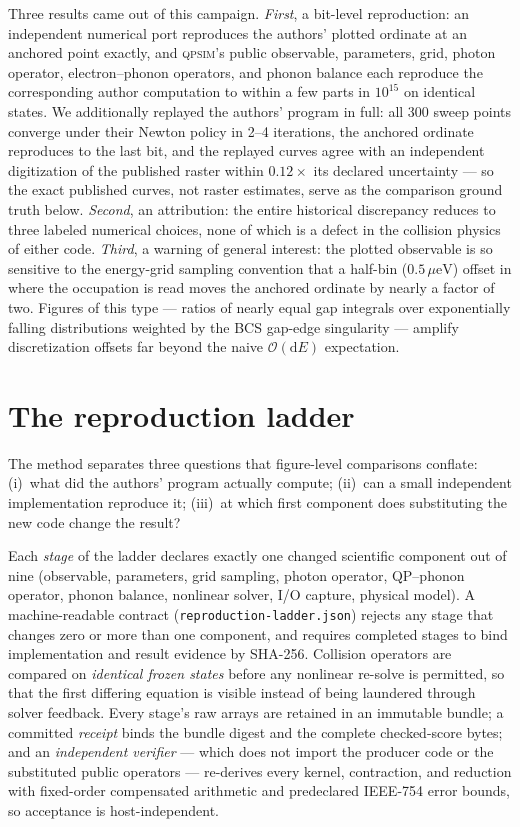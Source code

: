 \documentclass[reprint,amsmath,amssymb,aps,prapplied,nofootinbib]{revtex4-2}
\newcommand{\qpsim}{\textsc{qpsim}}
\newcommand{\ueV}{\,\mu\mathrm{eV}}
\begin{document}
Three results came out of this campaign.
\emph{First}, a bit-level reproduction: an independent numerical port
reproduces the authors' plotted ordinate at an anchored point exactly,
and \qpsim{}'s public observable, parameters, grid, photon operator,
electron--phonon operators, and phonon balance each reproduce the
corresponding author computation to within a few parts in $10^{15}$ on
identical states.  We additionally replayed the authors' program in
full: all 300 sweep points converge under their Newton policy in 2--4
iterations, the anchored ordinate reproduces to the last bit, and the
replayed curves agree with an independent digitization of the
published raster within $0.12\times$ its declared uncertainty ---
so the exact published curves, not raster estimates, serve as the
comparison ground truth below.  \emph{Second}, an attribution: the entire historical
discrepancy reduces to three labeled numerical choices, none of which is
a defect in the collision physics of either code.  \emph{Third}, a
warning of general interest: the plotted observable is so sensitive to
the energy-grid sampling convention that a half-bin ($0.5\ueV$) offset
in where the occupation is read moves the anchored ordinate by nearly a
factor of two.  Figures of this type --- ratios of nearly equal gap
integrals over exponentially falling distributions weighted by the BCS
gap-edge singularity --- amplify discretization offsets far beyond the
naive $\mathcal{O}(\mathrm{d}E)$ expectation.

\section{The reproduction ladder}
\label{sec:ladder}

The method separates three questions that figure-level comparisons
conflate: (i)~what did the authors' program actually compute; (ii)~can a
small independent implementation reproduce it; (iii)~at which first
component does substituting the new code change the result?

Each \emph{stage} of the ladder declares exactly one changed scientific
component out of nine (observable, parameters, grid sampling, photon
operator, QP--phonon operator, phonon balance, nonlinear solver, I/O
capture, physical model).  A machine-readable contract
(\texttt{reproduction-ladder.json}) rejects any stage that changes zero
or more than one component, and requires completed stages to bind
implementation and result evidence by SHA-256.  Collision operators are
compared on \emph{identical frozen states} before any nonlinear re-solve
is permitted, so that the first differing equation is visible instead of
being laundered through solver feedback.  Every stage's raw arrays are
retained in an immutable bundle; a committed \emph{receipt} binds the
bundle digest and the complete checked-score bytes; and an
\emph{independent verifier} --- which does not import the producer code
or the substituted public operators --- re-derives every kernel,
contraction, and reduction with fixed-order compensated arithmetic and
predeclared IEEE-754 error bounds, so acceptance is host-independent.
\end{document}
